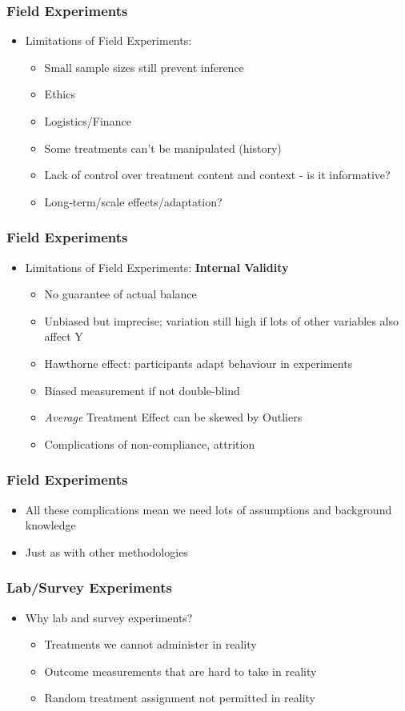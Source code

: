 \documentclass[xcolor=x11names,compress]{beamer}\usepackage[]{graphicx}\usepackage[]{color}
\renewcommand{\(}{\begin{columns}}
\renewcommand{\)}{\end{columns}}
\newcommand{\<}[1]{\begin{column}{#1}}
\renewcommand{\>}{\end{column}}
\begin{document}
\begin{frame}
\frametitle{Field Experiments}
\begin{itemize}
\item Limitations of Field Experiments: 
\pause
\begin{itemize}
\item Small sample sizes still prevent inference
\item Ethics
\item Logistics/Finance
\item Some treatments can't be manipulated (history)
\item Lack of control over treatment content and context - is it informative?
\item Long-term/scale effects/adaptation?
\end{itemize}
\end{itemize}
\end{frame}

\begin{frame}
\frametitle{Field Experiments}
\begin{itemize}
\item Limitations of Field Experiments: \textbf{Internal Validity}
\pause
\begin{itemize}
\item No guarantee of actual balance
\item Unbiased but imprecise; variation still high if lots of other variables also affect Y
\item Hawthorne effect: participants adapt behaviour in experiments
\item Biased measurement if not double-blind
\item \textit{Average} Treatment Effect can be skewed by Outliers
\item Complications of non-compliance, attrition
\end{itemize}
\end{itemize}
\end{frame}

\begin{frame}
\frametitle{Field Experiments}
\begin{itemize}
\item All these complications mean we need lots of assumptions and background knowledge
\item Just as with other methodologies
\end{itemize}
\end{frame}

\begin{frame}
\frametitle{Lab/Survey Experiments}
\begin{itemize}
\item Why lab and survey experiments?
\pause
\begin{itemize}
\item Treatments we cannot administer in reality
\item Outcome measurements that are hard to take in reality
\item Random treatment assignment not permitted in reality
\end{itemize}
\end{itemize}
\end{frame}
\end{document}
